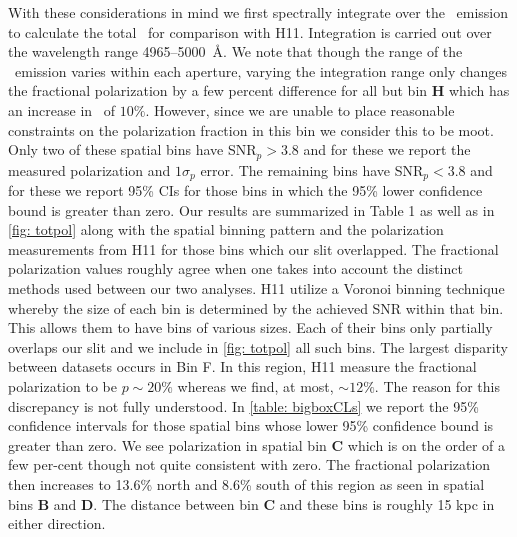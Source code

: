 With these considerations in mind we first spectrally integrate over the \lya~emission to calculate the total \pol~for comparison with H11.  Integration is carried out over the wavelength range 4965--5000~\AA. We note that though the range of the \lya~emission varies within each aperture, varying the integration range only changes the fractional polarization by a few percent difference for all but bin \textbf{H} which has an increase in \pol~of $10\%$. However, since we are unable to place reasonable constraints on the polarization fraction in this bin we  consider this to be moot. Only two of these spatial bins have SNR$_p > 3.8$ and for these we report the measured polarization and $1\sigma_p$ error.  The remaining bins have SNR$_p < 3.8$ and for these we report 95\% CIs for those bins in which the 95\% lower confidence bound is greater than zero. Our results are summarized in Table 1 as well as in \autoref{fig: totpol} along with the spatial binning pattern and the polarization measurements from H11 for those bins which our slit overlapped. The fractional polarization values roughly agree when one takes into account the distinct methods used between our two analyses. H11 utilize a Voronoi binning technique whereby the size of each bin is determined by the achieved SNR within that bin. This allows them to have bins of various sizes. Each of their bins only partially overlaps our slit and we include in \autoref{fig: totpol} all such bins. The largest disparity between datasets occurs in Bin F. In this region, H11 measure the fractional polarization to be $p\sim20\%$ whereas we find, at most, $\sim12\%$. The reason for this discrepancy is not fully understood. In \autoref{table: bigboxCLs} we report the 95\% confidence intervals for those spatial bins whose lower 95\% confidence bound is greater than zero. We see polarization in spatial bin \textbf{C} which is on the order of a few per-cent though not quite consistent with zero. The fractional polarization then increases to 13.6\% north and 8.6\% south of this region as seen in spatial bins \textbf{B} and \textbf{D}. The distance between bin \textbf{C} and these bins is roughly 15 kpc in either direction. 


